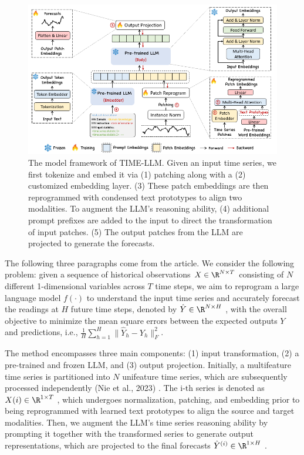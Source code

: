 \begin{figure}[h!]
	\includegraphics[width=\linewidth]{"pictures/prompt-embedding.png"} %
	\caption{The model framework of TIME-LLM. Given an input time series, we first tokenize and
		embed it via (1) patching along with a (2) customized embedding layer. (3) These patch embeddings
		are then reprogrammed with condensed text prototypes to align two modalities. To augment the
		LLM’s reasoning ability, (4) additional prompt prefixes are added to the input to direct the transformation
		of input patches. (5) The output patches from the LLM are projected to generate the forecasts.}
	\label{fig:prompt_embedding_fig}
\end{figure}



The following three paragraphs come from the article.
We consider the following problem: given a sequence of historical observations \(X \in \R^{N\times T}\)
consisting of \(N\) different 1-dimensional variables across \(T\) time steps, we aim to reprogram a large
language model \(f(\cdot)\) to understand the input time series and accurately forecast the readings at \(H\) future time steps, denoted by \(\hat{Y} \in \R^{N\times H}\) , with the overall objective to minimize the mean square errors between the expected outputs \(Y\) and predictions, i.e., \(\frac1H \sum_{h=1}^H \| \hat{Y}_h - Y_h \|_F^2 \).

The method encompasses three main components: (1) input transformation, (2) a pre-trained and frozen LLM, and (3) output projection. Initially, a multifeature time series is partitioned into \(N\) unifeature time series, which are subsequently processed independently (Nie et al., 2023) \cite{nie_et_al}.
The i-th series is denoted as \(X(i) \in \R^{1\times T}\) , which undergoes normalization, patching, and embedding prior to being reprogrammed with learned text prototypes to align the source and target modalities.
Then, we augment the LLM’s time series reasoning ability by prompting it together with the transformed series to generate output representations, which are projected to the final forecasts \(\hat{Y}^{(i)} \in \R^{1\times H}\) .

